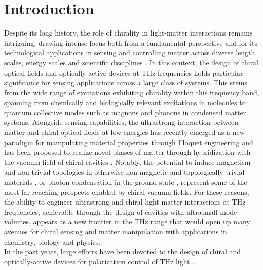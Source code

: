 \documentclass[twocolumn]{article}
\begin{document}
\section*{Introduction}
Despite its long history, the role of chirality in light-matter interactions remains intriguing, drawing intense focus both from a fundamental perspective \cite{Tang_2010,Mun_2020} and for its technological applications in sensing and controlling matter across diverse length scales, energy scales and scientific disciplines \cite{Tang_2011, Bord_cs_2012, Lodahl_2017,Brandt_2017,Lininger_2022,Genet_2022}. In this context, the design of chiral optical fields and optically-active devices at THz frequencies holds particular significance for sensing applications across a large class of systems. This stems from the wide range of excitations exhibiting chirality within this frequency band, spanning from chemically and biologically relevant excitations in molecules \cite{Choi_2022,Choi2022} to quantum collective modes such as magnons \cite{Bord_cs_2012, Kampfrath_2010,Cui_2023} and phonons \cite{Cui_2023,Ishito_2022,Baydin_2022} in condensed matter systems. Alongside sensing capabilities, the ultrastrong interaction between matter and chiral optical fields at low energies has recently emerged as a new paradigm for manipulating material properties through Floquet engineering \cite{Wang_2013,McIver_2019,Topp_2019} and has been proposed to realize novel phases of matter through hybridization with the vacuum field of chiral cavities \cite{Wang_2019,H_bener_2020, Tokatly_2021,Sedov_2022,Owens_2022}. Notably, the potential to induce magnetism and non-trivial topologies in otherwise non-magnetic and topologically trivial materials \cite{Wang_2019,Sedov_2022, Masuki_2023}, or photon condensation in the ground state \cite{Mercurio_2024}, represent some of the most far-reaching prospects enabled by chiral vacuum fields. For these reasons, the ability to engineer ultrastrong and chiral light-matter interactions at THz frequencies, achievable through the design of cavities with ultrasmall mode volumes, appears as a new frontier in the THz range \cite{Andberger_2023} that would open up many avenues for chiral sensing and matter manipulation with applications in chemistry, biology and physics.\\
In the past years, large efforts have been devoted to the design of chiral and optically-active devices for polarization control of THz light \cite{Zhang_2012, Wu_2014, Kan_2015,Kim_2017,Choi_2019,Cong_2019, Mu_2019, Tan_2021, Ju_2023}. 
\end{document}
